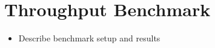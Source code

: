 \section{Throughput Benchmark}

\begin{itemize}
    \item Describe benchmark setup and results
\end{itemize}